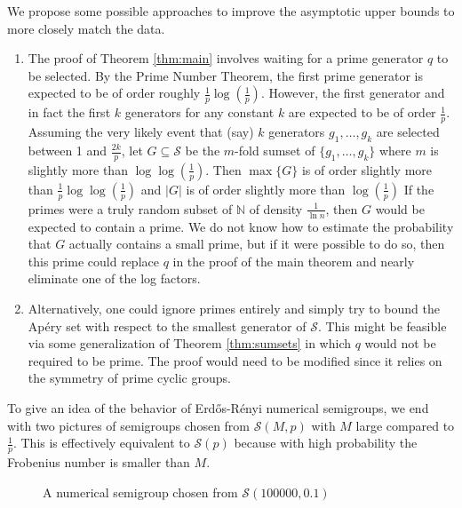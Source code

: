 \documentclass[11pt]{amsart}
\theoremstyle{definition}
\theoremstyle{remark}
\def\NN{\ensuremath{\mathbb{N}}}
\def\nsg{\ensuremath{\mathcal{S}}}
\begin{document}
We propose some possible approaches to improve the asymptotic upper bounds to more closely match the data. 
\begin{enumerate}
\item The proof of Theorem \ref{thm:main} involves waiting for a prime generator $q$ to be selected. By the Prime Number Theorem, the first prime generator is expected to be of order roughly $\frac{1}{p} \log \left(\frac{1}{p}\right)$. However, the first generator and in fact the first $k$ generators for any constant $k$ are expected to be of order $\frac{1}{p}$. Assuming the very likely event that (say) $k$ generators $g_1, \dots, g_k$ are selected between 1 and $\frac{2k}{p}$, let $G \subseteq \nsg$ be the $m$-fold sumset of $\{g_1, \dots, g_k\}$ where $m$ is slightly more than $\log \log \left( \frac{1}{p} \right)$. Then $\max\{G\}$ is of order slightly more than $\frac{1}{p} \log \log \left( \frac{1}{p} \right)$ and $|G|$ is of order slightly more than $\log \left( \frac{1}{p} \right)$  If the primes were a truly random subset of $\NN$ of density $\frac{1}{\ln n}$, then $G$ would be expected to contain a prime. We do not know how to estimate the probability that $G$ actually contains a small prime, but if it were possible to do so, then this prime could replace $q$ in the proof of the main theorem and nearly eliminate one of the log factors.      

\item Alternatively, one could ignore primes entirely and simply try to bound the Ap\'ery set with respect to the smallest generator of $\nsg$. This might be feasible via some generalization of Theorem \ref{thm:sumsets} in which $q$ would not be required to be prime. The proof would need to be modified since it relies on the symmetry of prime cyclic groups.
\end{enumerate}

To give an idea of the behavior of Erd\H{o}s-R\'enyi numerical semigroups, we end with two pictures of semigroups chosen from $\nsg(M,p)$ with $M$ large compared to $\frac{1}{p}$. This is effectively equivalent to $\nsg(p)$ because with high probability the Frobenius number is smaller than $M$.

\begin{figure}[ht]
        \begin{center}
            \scalebox{0.6}{}
        \end{center}
\caption{A numerical semigroup chosen from $\nsg(100000, 0.1)$}     
\end{figure}
\end{document}
